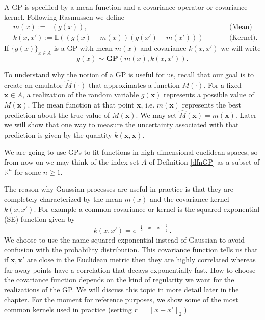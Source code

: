\documentclass[12pt]{book}
\newcommand{\E}{\mathbb{E}} %
\newcommand{\x}{\textbf{x}}
\begin{document}
A GP is specified by a mean function and a covariance operator or covariance kernel. 
Following  Rasmussen \cite{rasmussen2006gaussian} we define
\begin{align*}
& m(x):=\E(g(x)),&&\qquad\text{(Mean)}\\
& k(x,x'):=\E((g(x)-m(x))(g(x')-m(x')))&&\qquad\text{(Kernel)}.
\end{align*}
If $\{g(x)\}_{x\in A}$ is a GP with mean $m(x)$ and covariance $k(x,x')$ we will write
\begin{equation*}
g(x)\sim \textbf{GP}(m(x),k(x,x')).
\end{equation*} 

To  understand why the notion of a GP is useful for us, recall that our goal is to create
an emulator $\widehat{M}(\cdot)$ that approximates a function $M(\cdot)$. 
For a fixed $\x\in A$, a realization of the  random variable $g(\x)$ represents
a possible value of $M(\x)$. The mean function at that point $\x$, i.e. $m(\x)$ 
represents the best prediction about the true value of $M(\x)$. We may set
$\widehat{M}(\x)=m(\x)$. Later we will show that one way to measure the  uncertainty 
associated with that prediction is given by the quantity $k(\x,\x)$.

 

We are going to use GPs to fit  functions in  high dimensional euclidean spaces, so from 
now on we may think
of the  index set $A$ of Definition \ref{dfnGP} as a subset of $\mathbb{R}^{n}$ for some $n\geq 1$. 
\newline

The reason why  Gaussian processes are useful in practice is that  they are 
completely characterized by the mean $m(x)$ and the covariance kernel $k(x,x')$\cite{lifshits2012lectures}. 
 For example a  common covariance or kernel is the
 squared exponential (SE) function given by  
\begin{equation}\label{eqnsquareexponential}
k(x,x')=e^{-\frac{1}{2}\|x-x'\|_{2}^{2}}.
\end{equation}
We choose to use the name squared exponential instead of 
Gaussian to avoid confusion with
the probability distribution.
This  covariance function tells us that if $\x,\x'$ are close in the Euclidean metric 
then they are highly correlated whereas far away points have a correlation that decays exponentially fast.
How to choose the covariance function depends on the kind
of regularity we want for the realizations of the GP. We will discuss this topic in
more detail later in the chapter. For the moment for reference purposes, we show 
some of the most common kernels used in practice \cite{rasmussen2006gaussian} (setting $r=\|x-x'\|_{2}$)
\end{document}
